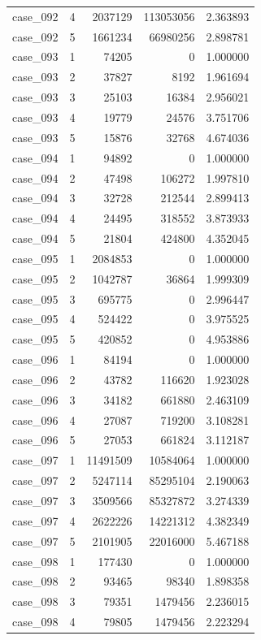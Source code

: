 \begin{longtable}{lrrrr}
case\_092 & 4 & 2037129 & 113053056 & 2.363893 \\
case\_092 & 5 & 1661234 & 66980256 & 2.898781 \\
case\_093 & 1 & 74205 & 0 & 1.000000 \\
case\_093 & 2 & 37827 & 8192 & 1.961694 \\
case\_093 & 3 & 25103 & 16384 & 2.956021 \\
case\_093 & 4 & 19779 & 24576 & 3.751706 \\
case\_093 & 5 & 15876 & 32768 & 4.674036 \\
case\_094 & 1 & 94892 & 0 & 1.000000 \\
case\_094 & 2 & 47498 & 106272 & 1.997810 \\
case\_094 & 3 & 32728 & 212544 & 2.899413 \\
case\_094 & 4 & 24495 & 318552 & 3.873933 \\
case\_094 & 5 & 21804 & 424800 & 4.352045 \\
case\_095 & 1 & 2084853 & 0 & 1.000000 \\
case\_095 & 2 & 1042787 & 36864 & 1.999309 \\
case\_095 & 3 & 695775 & 0 & 2.996447 \\
case\_095 & 4 & 524422 & 0 & 3.975525 \\
case\_095 & 5 & 420852 & 0 & 4.953886 \\
case\_096 & 1 & 84194 & 0 & 1.000000 \\
case\_096 & 2 & 43782 & 116620 & 1.923028 \\
case\_096 & 3 & 34182 & 661880 & 2.463109 \\
case\_096 & 4 & 27087 & 719200 & 3.108281 \\
case\_096 & 5 & 27053 & 661824 & 3.112187 \\
case\_097 & 1 & 11491509 & 10584064 & 1.000000 \\
case\_097 & 2 & 5247114 & 85295104 & 2.190063 \\
case\_097 & 3 & 3509566 & 85327872 & 3.274339 \\
case\_097 & 4 & 2622226 & 14221312 & 4.382349 \\
case\_097 & 5 & 2101905 & 22016000 & 5.467188 \\
case\_098 & 1 & 177430 & 0 & 1.000000 \\
case\_098 & 2 & 93465 & 98340 & 1.898358 \\
case\_098 & 3 & 79351 & 1479456 & 2.236015 \\
case\_098 & 4 & 79805 & 1479456 & 2.223294 \\

\end{longtable}
